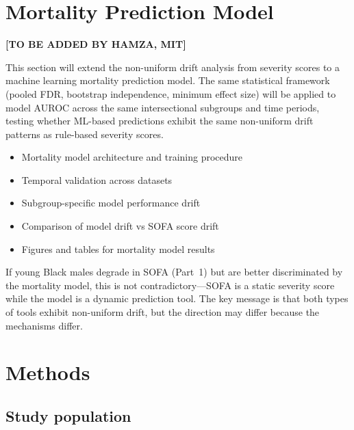 \documentclass[pdflatex,sn-mathphys-num]{sn-jnl}
\theoremstyle{thmstyleone}%
\theoremstyle{thmstyletwo}%
\theoremstyle{thmstylethree}%
\begin{document}
{\color{red}
\section{Mortality Prediction Model}\label{sec:mortality_model}

\textbf{[TO BE ADDED BY HAMZA, MIT]}

This section will extend the non-uniform drift analysis from severity scores to a machine learning mortality prediction model. The same statistical framework (pooled FDR, bootstrap independence, minimum effect size) will be applied to model AUROC across the same intersectional subgroups and time periods, testing whether ML-based predictions exhibit the same non-uniform drift patterns as rule-based severity scores.

\begin{itemize}
\item Mortality model architecture and training procedure
\item Temporal validation across datasets
\item Subgroup-specific model performance drift
\item Comparison of model drift vs SOFA score drift
\item Figures and tables for mortality model results
\end{itemize}

If young Black males degrade in SOFA (Part~1) but are better discriminated by the mortality model, this is not contradictory---SOFA is a static severity score while the model is a dynamic prediction tool. The key message is that both types of tools exhibit non-uniform drift, but the direction may differ because the mechanisms differ.
}

\section{Methods}\label{sec:methods}

\subsection{Study population}\label{subsec:datasets}
\end{document}
